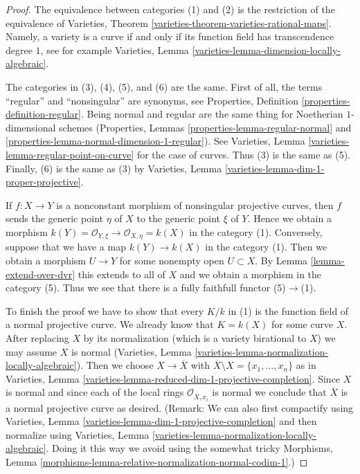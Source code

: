 \begin{proof}
The equivalence between categories (1) and (2) is the restriction of the
equivalence of
Varieties, Theorem \ref{varieties-theorem-varieties-rational-maps}.
Namely, a variety is a curve if and only if its function field has
transcendence degree $1$, see for example
Varieties, Lemma \ref{varieties-lemma-dimension-locally-algebraic}.

\medskip\noindent
The categories in (3), (4), (5), and (6) are the same. First of all, the
terms ``regular'' and ``nonsingular'' are synonyms, see
Properties, Definition \ref{properties-definition-regular}.
Being normal and regular are the same thing for Noetherian
$1$-dimensional schemes
(Properties, Lemmas \ref{properties-lemma-regular-normal} and
\ref{properties-lemma-normal-dimension-1-regular}). See
Varieties, Lemma \ref{varieties-lemma-regular-point-on-curve}
for the case of curves. Thus (3) is the same as (5). Finally, (6)
is the same as (3) by
Varieties, Lemma \ref{varieties-lemma-dim-1-proper-projective}.

\medskip\noindent
If $f : X \to Y$ is a nonconstant morphism of nonsingular projective curves,
then $f$ sends the generic point $\eta$ of $X$ to the generic point $\xi$ of
$Y$. Hence we obtain a morphism
$k(Y) = \mathcal{O}_{Y, \xi} \to \mathcal{O}_{X, \eta} = k(X)$
in the category (1). Conversely, suppose that we have a map
$k(Y) \to k(X)$ in the category (1). Then we obtain a morphism $U \to Y$
for some nonempty open $U \subset X$. By Lemma \ref{lemma-extend-over-dvr}
this extends to all of $X$ and we obtain a morphism in the category (5).
Thus we see that there is a fully faithfull functor (5)$\to$(1).

\medskip\noindent
To finish the proof we have to show that every $K/k$ in (1)
is the function field of a normal projective curve.
We already know that $K = k(X)$ for some curve $X$.
After replacing $X$ by its normalization
(which is a variety birational to $X$)
we may assume $X$ is normal
(Varieties, Lemma \ref{varieties-lemma-normalization-locally-algebraic}).
Then we choose $X \to \overline{X}$ with
$\overline{X} \setminus X = \{x_1, \ldots, x_n\}$ as in
Varieties, Lemma \ref{varieties-lemma-reduced-dim-1-projective-completion}.
Since $X$ is normal and since each
of the local rings $\mathcal{O}_{\overline{X}, x_i}$ is normal
we conclude that $\overline{X}$ is a normal projective curve as desired.
(Remark: We can also first compactify using
Varieties, Lemma \ref{varieties-lemma-dim-1-projective-completion}
and then normalize using
Varieties, Lemma \ref{varieties-lemma-normalization-locally-algebraic}.
Doing it this way we avoid using the somewhat tricky
Morphisms, Lemma \ref{morphisms-lemma-relative-normalization-normal-codim-1}.)
\end{proof}

